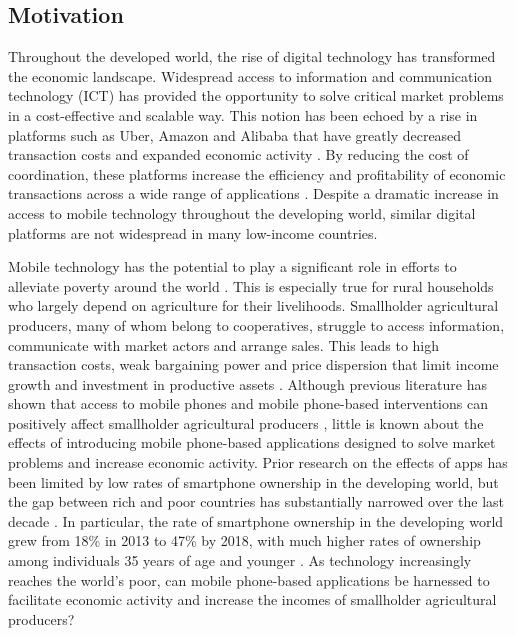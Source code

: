 \documentclass[11pt]{article}
\begin{document}
\subsection{Motivation} \label{sec:E3_motivation}
Throughout the developed world, the rise of digital technology has transformed the economic landscape. Widespread access to information and communication technology (ICT) has provided the opportunity to solve critical market problems in a cost-effective and scalable way. This notion has been echoed by a rise in platforms such as Uber, Amazon and Alibaba that have greatly decreased transaction costs and expanded economic activity \citep{munger18}. By reducing the cost of coordination, these platforms increase the efficiency and profitability of economic transactions across a wide range of applications \citep{worldbank16}. Despite a dramatic increase in access to mobile technology throughout the developing world, similar digital platforms are not widespread in many low-income countries.

Mobile technology has the potential to play a significant role in efforts to alleviate poverty around the world \citep{aker-et.al.16}. This is especially true for rural households who largely depend on agriculture for their livelihoods. Smallholder agricultural producers, many of whom belong to cooperatives, struggle to access information, communicate with market actors and arrange sales. This leads to high transaction costs, weak bargaining power and price dispersion that limit income growth and investment in productive assets \citep{staal-et.al.97}. Although previous literature has shown that access to mobile phones and mobile phone-based interventions can positively affect smallholder agricultural producers \citep{aker10,cole-fernando12,curtois-subervie14,jensen07,nakasone13}, little is known about the effects of introducing mobile phone-based applications designed to solve market problems and increase economic activity. Prior research on the effects of apps has been limited by low rates of smartphone ownership in the developing world, but the gap between rich and poor countries has substantially narrowed over the last decade \citep{worldbank16}. In particular, the rate of smartphone ownership in the developing world grew from 18\% in 2013 to 47\% by 2018, with much higher rates of ownership among individuals 35 years of age and younger \citep{pew18}. As technology increasingly reaches the world’s poor, can mobile phone-based applications be harnessed to facilitate economic activity and increase the incomes of smallholder agricultural producers?
\end{document}
